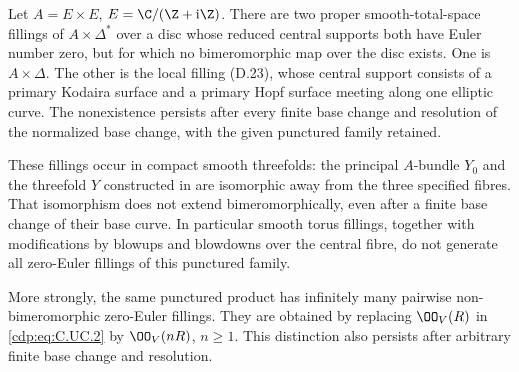 \begin{proposition}\hypertarget{tag-01D8}{}\label{cdp:st:C.2.UN.3}

Let $A=E\times E$, $E=\C/(\Z+\mathrm i\Z)$.
There are two proper smooth-total-space fillings of
$A\times\Delta^*$ over a disc whose reduced central
supports both have Euler number zero, but for which
no bimeromorphic map over the disc exists. One is
$A\times\Delta$. The other is the local filling
(D.23), whose central support consists of a primary
Kodaira surface and a primary Hopf surface meeting
along one elliptic curve. The nonexistence persists
after every finite base change and resolution of the
normalized base change, with the given punctured
family retained.

These fillings occur in compact smooth threefolds:
the principal $A$-bundle $Y_0$ and the threefold $Y$
constructed in  are isomorphic away from the
three specified fibres. That isomorphism does not
extend bimeromorphically, even after a finite base
change of their base curve. In particular smooth
torus fillings, together with modifications by
blowups and blowdowns over the central fibre, do
not generate all zero-Euler fillings of this
punctured family.

More strongly, the same punctured product has
infinitely many pairwise non-bimeromorphic
zero-Euler fillings. They are obtained by replacing
$\OO_V(R)$ in \eqref{cdp:eq:C.UC.2} by $\OO_V(nR)$,
$n\ge1$. This distinction also persists after
arbitrary finite base change and resolution.
\end{proposition}



